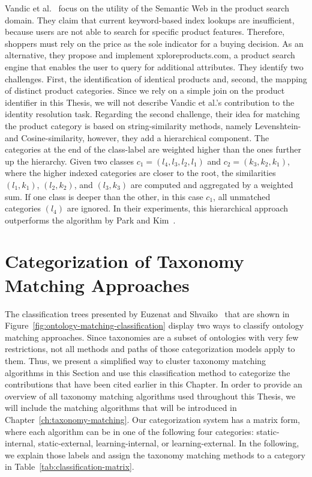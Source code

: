 Vandic et al.\@~\cite{vandic2012faceted} focus on the utility of the Semantic Web in the product search domain.
They claim that current keyword-based index lookups are insufficient, because users are not able to search for
specific product features.
Therefore, shoppers must rely on the price as the sole indicator for a buying decision.
As an alternative, they propose and implement xploreproducts.com, a product search engine that enables the user
to query for additional attributes.
They identify two challenges.
First, the identification of identical products and, second, the mapping of distinct product categories.
Since we rely on a simple join on the product identifier in this Thesis, we will not describe Vandic et al.'s contribution
to the identity resolution task.
Regarding the second challenge, their idea for matching the product category is based on string-similarity methods,
namely Levenshtein- and Cosine-similarity, however, they add a hierarchical component.
The categories at the end of the class-label are weighted higher than the ones further up the hierarchy.
Given two classes $c_1 = (l_4, l_3, l_2, l_1)$ and $c_2 = (k_3, k_2, k_1)$, where the higher indexed categories are closer
to the root, the similarities $(l_1, k_1)$, $(l_2, k_2)$, and $(l_3, k_3)$ are computed and aggregated by a weighted sum.
If one class is deeper than the other, in this case $c_1$, all unmatched categories $(l_4)$ are ignored.
In their experiments, this hierarchical approach outperforms the algorithm by Park and Kim~\cite{park2007ontology}.

\section{Categorization of Taxonomy Matching Approaches}
\label{sec:categorization-om}

The classification trees presented by Euzenat and Shvaiko~\cite{euzenat2007ontology} that are shown in
Figure~\ref{fig:ontology-matching-classification} display two ways to classify ontology matching approaches.
Since taxonomies are a subset of ontologies with very few restrictions, not all methods and paths of those categorization
models apply to them.
Thus, we present a simplified way to cluster taxonomy matching algorithms in this Section and use this classification method to
categorize the contributions that have been cited earlier in this Chapter.
In order to provide an overview of all taxonomy matching algorithms used throughout this Thesis, we will
include the matching algorithms that will be introduced in Chapter~\ref{ch:taxonomy-matching}.
Our categorization system has a matrix form, where each algorithm can be in one of the following four categories:
static-internal, static-external, learning-internal, or learning-external.
In the following, we explain those labels and assign the taxonomy matching methods to a category in Table~\ref{tab:classification-matrix}.

